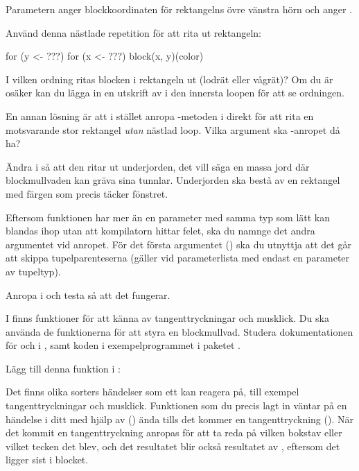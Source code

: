 Parametern  anger blockkoordinaten för rektangelns övre vänstra hörn och  anger .

Använd denna nästlade repetition för att rita ut rektangeln:

\begin{Code}
for (y <- ???) {
	for (x <- ???) {
		block(x, y)(color)
	}
}
\end{Code}

\Subtask\Pen
I vilken ordning ritas blocken i rektangeln ut (lodrät eller vågrät)? Om du är osäker kan du lägga in en utskrift av  i den innersta loopen för att se ordningen.

\Subtask\Pen En annan lösning är att i stället anropa -metoden i  direkt för att rita en motsvarande stor rektangel \emph{utan} nästlad loop. Vilka argument ska -anropet då ha?

\Subtask Ändra i  så att den ritar ut underjorden, det vill säga en massa jord där blockmullvaden kan gräva sina tunnlar.
 Underjorden ska bestå av en rektangel med färgen  som precis täcker fönstret.

Eftersom funktionen  har mer än en parameter med samma typ som lätt kan blandas ihop utan att kompilatorn hittar felet, ska du namnge det andra argumentet  vid anropet. För det första argumentet () ska du utnyttja att det går att skippa tupelparenteserna (gäller vid parameterlista med endast en parameter av tupeltyp).

\Subtask Anropa  i  och testa så att det fungerar.

\Task
I  finns funktioner för att känna av tangenttryckningar och musklick.
Du ska använda de funktionerna för att styra en blockmullvad. Studera dokumentationen för  och  i , samt koden i exempelprogrammet  i paketet .

\Subtask
Lägg till denna funktion i :
\noindent Det finns olika sorters händelser som ett  kan reagera på, till exempel tangenttryckningar och musklick.
Funktionen som du precis lagt in väntar på en händelse i ditt  med hjälp av () ända tills det kommer en tangenttryckning ().
När det kommit en tangenttryckning anropas  för att ta reda på vilken bokstav eller vilket tecken det blev, och det resultatet blir också resultatet av , eftersom det ligger sist i blocket.

